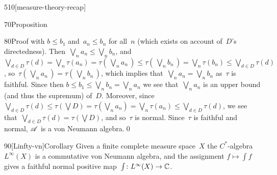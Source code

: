 \begin{parsec}{510}[measure-theory-recap]
\begin{point}{70}{Proposition}
\begin{point}{80}{Proof}
with $b\leq b_1$ and~$a_n\leq b_n$ for all~$n$
(which exists on account of~$D$'s directedness).
Then~$\bigvee_n a_n \leq \bigvee_n b_n$,
and~$\bigvee_{d\in D} \tau(d) =\bigvee_n \tau(a_n)
=\tau(\,\bigvee_n a_n\,)
\leq \tau(\,\bigvee_n b_n\,)
= \bigvee_n \tau(b_n) \leq \bigvee_{d\in D} \tau(d)$,
so~$\tau(\,\bigvee_n a_n\,) = \tau(\,\bigvee_n b_n\,)$,
which implies that~$\bigvee_n a_n = \bigvee_n b_n$
as~$\tau$ is faithful.
Since then $b\leq b_1\leq \bigvee_n b_n = \bigvee_n a_n$
we see that~$\bigvee_n a_n$ is an upper bound
(and thus the supremum) of~$D$.
Moreover,
since
$\bigvee_{d\in D} \tau(d) \leq
\tau(\bigvee D)
=\tau(\bigvee_n a_n)
=\bigvee_n\tau(a_n)
\leq \bigvee_{d\in D} \tau(d)$,
we see that~$\bigvee_{d\in D} \tau(d)
= \tau(\bigvee D)$,
and so~$\tau$ is normal.
Since~$\tau$ is faithful
and normal, $\mathscr{A}$ is a von Neumann algebra.\qed
\end{point}
\end{point}
\begin{point}{90}[Linfty-vn]{Corollary}%
Given a finite complete measure space~$X$ 
the $C^*$-algebra $L^\infty(X)$
is a commutative von Neumann algebra,
and the assignment $f\mapsto \int f$
gives a faithful normal positive
map~$\int\colon L^\infty(X)\to\mathbb{C}$.
\end{point}
\end{parsec}
